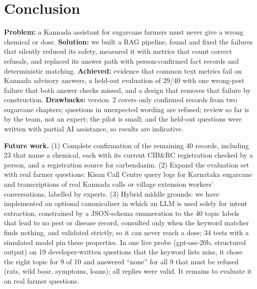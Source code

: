 \documentclass[conference]{IEEEtran}
\begin{document}
\section{Conclusion}
\textbf{Problem:} a Kannada assistant for sugarcane farmers must never give a wrong
chemical or dose. \textbf{Solution:} we built a RAG pipeline, found and fixed the failures
that silently reduced its safety, measured it with metrics that count correct refusals, and
replaced its answer path with person-confirmed fact records and deterministic matching.
\textbf{Achieved:} evidence that common text metrics fail on Kannada advisory answers, a
held-out evaluation of 29/40 with one wrong-pest failure that both answer checks missed, and
a design that removes that failure by construction. \textbf{Drawbacks:} version~2 covers only
confirmed records from two sugarcane chapters; questions in unexpected wording are refused;
review so far is by the team, not an expert; the pilot is small; and the held-out questions
were written with partial AI assistance, so results are indicative.

\textbf{Future work.} (1) Complete confirmation of the remaining 40 records, including 23
that name a chemical, each with its current CIB\&RC registration checked by a person, and a
registration source for carbendazim. (2) Expand the evaluation set with real farmer
questions: Kisan Call Centre query logs for Karnataka sugarcane and transcriptions of real
Kannada calls or village extension workers' conversations, labelled by experts. (3) Hybrid
middle grounds: we have implemented an optional canonicaliser in which an LLM is used solely
for intent extraction, constrained by a JSON-schema enumeration to the 40 topic labels that
lead to no pest or disease record, consulted only when the keyword matcher finds nothing,
and validated strictly, so it can never reach a dose; 34 tests with a simulated model pin
these properties. In one live probe (gpt-oss-20b, structured output) on 19
developer-written questions that the keyword lists miss, it chose the right topic for 9 of
10 and answered ``none'' for all 9 that must be refused (rats, wild boar, symptoms, loans);
all replies were valid. It remains to evaluate it on real farmer questions.



\end{document}
